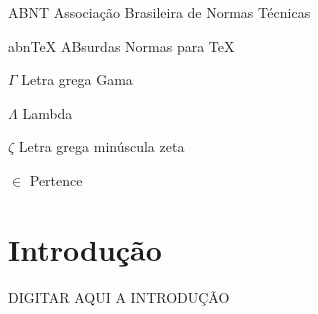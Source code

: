 \documentclass[
	12pt,				%
	openany,			%
	oneside,			%
	a4paper,			%
	english,			%
	french,				%
	spanish,			%
	brazil				%
	]{abntex2}
\begin{document}
% 

\listoffigures*
\cleardoublepage

\listoftables*
\cleardoublepage

\begin{siglas}
  \item[ABNT] Associação Brasileira de Normas Técnicas
  \item[abnTeX] ABsurdas Normas para TeX
\end{siglas}

\begin{simbolos}
  \item[$ \Gamma $] Letra grega Gama
  \item[$ \Lambda $] Lambda
  \item[$ \zeta $] Letra grega minúscula zeta
  \item[$ \in $] Pertence
\end{simbolos}

\tableofcontents*
\cleardoublepage



\textual

\chapter*[Introdução]{Introdução}

DIGITAR AQUI A INTRODUÇÃO
\end{document}
